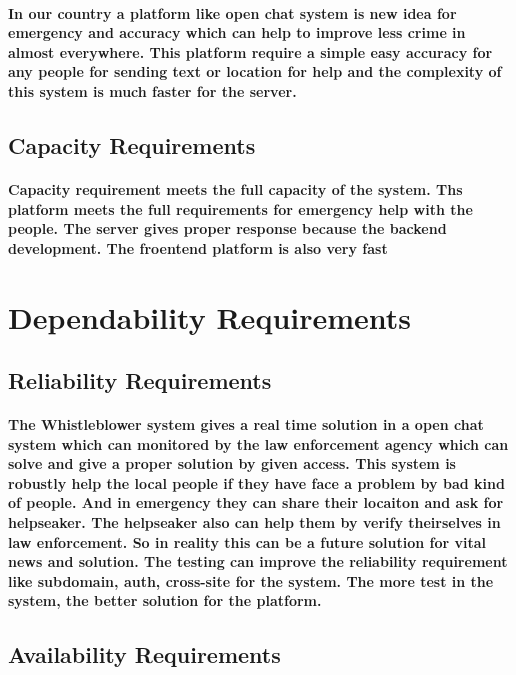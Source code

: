 \documentclass{article}
\begin{document}
\paragraph{In our country a platform like open chat system is new idea for emergency and accuracy which can help to improve less crime in almost everywhere. This platform require a 
simple easy accuracy for any people for sending text or location for help and the complexity of this system is much faster for the server.}
\subsection{Capacity Requirements}
\paragraph{Capacity requirement meets the full capacity of the system. Ths platform meets the full requirements for emergency help with the people. 
The server gives proper response because  the backend development. The froentend platform is also very fast }

\section{Dependability Requirements}
\subsection{Reliability Requirements}
\paragraph{The Whistleblower system gives a real time solution in a open chat system which can monitored by the law enforcement agency 
which can solve and give a proper solution by given access. This system is robustly help the local people if they have face a problem by bad kind of people. And in emergency they can share their locaiton and ask for helpseaker. The helpseaker also can help them by verify theirselves in law enforcement. So in reality this can be a future solution for vital news and solution. The testing can improve the reliability requirement like subdomain, auth, cross-site for the system. The more test in the system, the better solution for the platform.}

\subsection{Availability Requirements }
\end{document}
